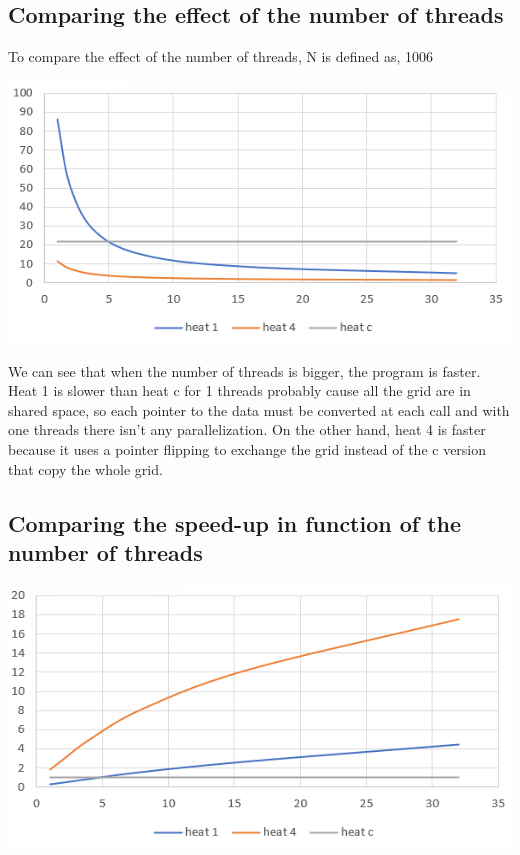 \documentclass{report}
\begin{document}
\subsection{Comparing the effect of the number of threads}

To compare the effect of the number of threads, N is defined as, 1006

\begin{center}
    \includegraphics[scale=1]{Images/Time_depending_threads.png}
    \label{fig10}
\end{center}

We can see that when the number of threads is bigger, the program is faster. Heat 1 is slower than heat c for 1 threads probably cause all the grid are in shared space, so each pointer to the data must be converted at each call and with one threads there isn't any parallelization. On the other hand, heat 4 is faster because it uses a pointer flipping to exchange the grid instead of the c version that copy the whole grid.

\subsection{Comparing the speed-up in function of the number of threads}

\begin{center}
    \includegraphics[scale=1]{Images/speeed_up_depending_threads.png}
    \label{fig11}
\end{center}
\end{document}
